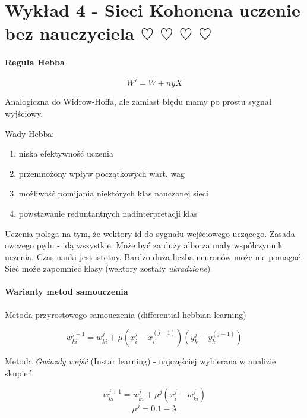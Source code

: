 \section{Wykład 4 - Sieci Kohonena uczenie bez nauczyciela $\heartsuit$ $\heartsuit$ $\heartsuit$ $\heartsuit$}

\paragraph{Reguła Hebba}

\begin{equation}
 W' = W + n y X
\end{equation}

Analogiczna do Widrow-Hoffa, ale zamiast błędu mamy po prostu sygnał wyjściowy.

Wady Hebba:

\begin{enumerate}
 \item niska efektywność uczenia
 \item przemnożony wpływ początkowych wart. wag
 \item możliwość pomijania niektórych klas nauczonej sieci
 \item powstawanie reduntantnych nadinterpretacji klas
\end{enumerate}

Uczenia polega na tym, że wektory id do sygnału wejściowego uczącego.
Zasada owczego pędu - idą wszystkie. Może być za duży albo za mały współczynnik uczenia.
Czas nauki jest istotny. Bardzo duża liczba neuronów może nie pomagać. Sieć może zapomnieć 
klasy (wektory zostały \textit{ukradzione})

\paragraph{Warianty metod samouczenia}

Metoda przyrostowego samouczenia (differential hebbian learning)

\begin{equation}
 w_{ki}^{j+1} = w_{ki}^j + \mu (x_i^j - x_i^(j-1))(y_k^j - y_k^(j-1))
\end{equation}

Metoda \textit{Gwiazdy wejść} (Instar learning) - najczęściej wybierana w analizie skupień

\begin{equation}
 w_{ki}^{j+1} = w_{ki}^j + \mu^j (x_i^j - w_{ki}^j)
\end{equation}
\begin{equation}
 \mu^j = 0.1 - \lambda
\end{equation}

